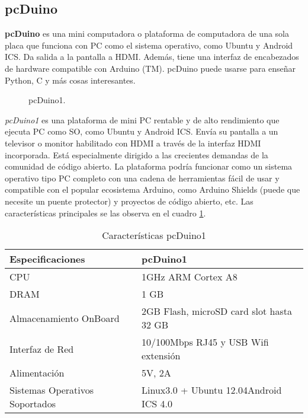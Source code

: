 \documentclass[conference]{IEEEtran}
\begin{document}
\subsection{pcDuino}
	\textbf{pcDuino} es una mini computadora o plataforma de computadora de una sola placa que funciona con PC como el sistema operativo, como Ubuntu y Android ICS. Da salida a la pantalla a HDMI. Además, tiene una interfaz de encabezados de hardware compatible con Arduino (TM). pcDuino puede usarse para enseñar Python, C y más cosas interesantes.\\
	\begin{figure}[h]
	\caption{pcDuino1.}
	\label{fig:ant01}
\end{figure}
	\textit{pcDuino1} es una plataforma de mini PC rentable y de alto rendimiento que ejecuta PC como SO, como Ubuntu y Android ICS. Envía su pantalla a un televisor o monitor habilitado con HDMI a través de la interfaz HDMI incorporada. Está especialmente dirigido a las crecientes demandas de la comunidad de código abierto. La plataforma podría funcionar como un sistema operativo tipo PC completo con una cadena de herramientas fácil de usar y compatible con el popular ecosistema Arduino, como Arduino Shields (puede que necesite un puente protector) y proyectos de código abierto, etc. Las características principales se las observa en el cuadro \ref{tab:pcd01}.\\
			\begin{table}[h]
\begin{center}
	\begin{tabular}{|p{2.5cm}|p{5.5cm}|}
	\hline 
	\textbf{Especificaciones} &\textbf{pcDuino1} \\ \hline
	CPU  &1GHz ARM Cortex A8\\\hline
	DRAM &1 GB \\\hline
	Almacenamiento OnBoard &2GB Flash, microSD card slot hasta 32 GB \\\hline
	Interfaz de Red & 10/100Mbps RJ45 y USB Wifi extensión\\\hline
	Alimentación &5V, 2A\\\hline
	Sistemas Operativos Soportados &Linux3.0 + Ubuntu 12.04Android ICS 4.0\\\hline
\end{tabular}\vspace{0.25cm}
\caption{Características pcDuino1}
\label{tab:pcd01}
\end{center}
\end{table}
\end{document}

